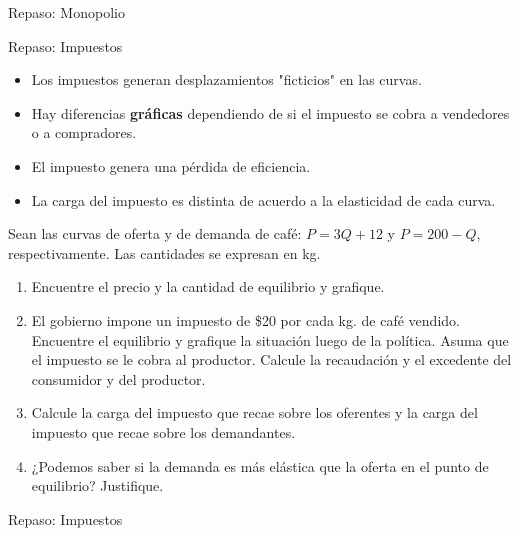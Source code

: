 \documentclass{beamer}
\begin{document}
\begin{frame}{Repaso: Monopolio}

\end{frame}

\begin{frame}{Repaso: Impuestos}
    \small
    \begin{itemize}
        \item Los impuestos generan desplazamientos "ficticios" en las curvas.
        \item Hay diferencias \textbf{gráficas} dependiendo de si el impuesto se cobra a vendedores o a compradores.
        \item El impuesto genera una pérdida de eficiencia.
        \item La carga del impuesto es distinta de acuerdo a la elasticidad de cada curva.
    \end{itemize}

    Sean las curvas de oferta y de demanda de café: \( P = 3Q + 12 \) y \( P = 200 - Q \), respectivamente. Las cantidades se expresan en kg.

    \begin{enumerate}
        \item Encuentre el precio y la cantidad de equilibrio y grafique.
        \item El gobierno impone un impuesto de \$20 por cada kg. de café vendido. Encuentre el equilibrio y grafique la situación luego de la política. Asuma que el impuesto se le cobra al productor. Calcule la recaudación y el excedente del consumidor y del productor.
        \item Calcule la carga del impuesto que recae sobre los oferentes y la carga del impuesto que recae sobre los demandantes.
        \item ¿Podemos saber si la demanda es más elástica que la oferta en el punto de equilibrio? Justifique.
    \end{enumerate}
\end{frame}

\begin{frame}{Repaso: Impuestos}

\end{frame}
\end{document}
